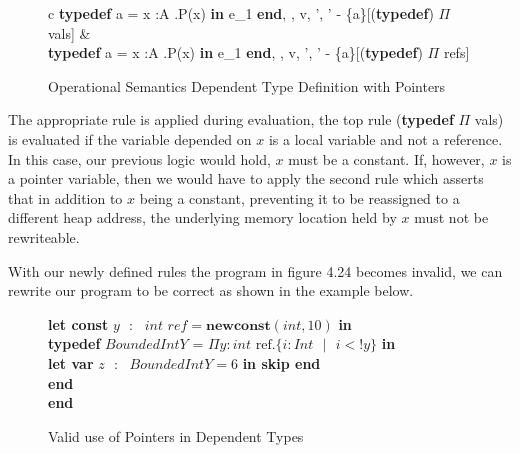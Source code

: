 \documentclass[a4paper,12pt]{report}
\newenvironment{tabs}[1]
 {\flushleft\TabPositions{#1}}
 {\endflushleft}
\begin{document}
\begin{figure}[H]
  \begin{center}
    \begin{tabular}{c}
      {\langle \textbf{typedef } a = \Pi x :A .P(x) \textbf{ in }e_1\textbf{ end}, 
      \sigma, \tau \rangle \longrightarrow 
        \langle v, \sigma', \tau' - \{a\}\rangle}[(\textbf{typedef}) $\Pi$ vals]  
      & \\
      {\langle \textbf{typedef } a = \Pi x :A .P(x) \textbf{ in }e_1\textbf{ end}, 
      \sigma, \tau \rangle \longrightarrow 
        \langle v, \sigma', \tau' - \{a\}\rangle}[(\textbf{typedef}) $\Pi$ refs] 
    \end{tabular}
  \end{center}
  \caption{Operational Semantics Dependent Type Definition with Pointers}
\end{figure}


\par
The appropriate rule is applied during evaluation, the top rule 
(\textbf{typedef} $\Pi$ vals) is evaluated if the variable depended on $x$ is 
a local variable and not a reference. In this case, our previous logic would hold, 
$x$ must be a constant. If, however, $x$ is a pointer variable, then we would have 
to apply the second rule which asserts that in addition to $x$ being a constant, 
preventing it to be reassigned to a different heap address, 
the underlying memory location held by $x$ must not be rewriteable. 

\par
With our newly defined rules the program in figure 4.24 becomes invalid, 
we can rewrite our program to be correct as shown in the example below. 

\begin{figure} [H]
  \begin{tabs}{1cm,2cm}
    \textbf{let const }$y\text{ }:\text{ } int \textit{ ref} = \textbf{newconst}(int, 10)$\textbf{ in }\\
    \tab\textbf{typedef }$BoundedIntY$ = $\Pi y : int\text{ ref}. \{i : Int\text{ }|\text{ }i < !y\}$ \textbf{ in } \\ 
    \tab\tab\textbf{let var }$z\text{ }:\text{ }BoundedIntY = 6$ \textbf{ in skip end}\\
    \tab\textbf {end} \\
    \textbf{end}
  \end{tabs}  
  \caption{Valid use of Pointers in Dependent Types}
\end{figure}
\end{document}

